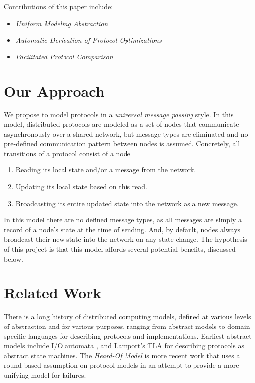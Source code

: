 \documentclass[acmsmall,screen,review]{acmart}
\begin{document}
Contributions of this paper include:
\begin{itemize}
    \item \textit{Uniform Modeling Abstraction}
    \item \textit{Automatic Derivation of Protocol Optimizations}
    \item \textit{Facilitated Protocol Comparison}
\end{itemize}

\section{Our Approach}

We propose to model protocols in a \textit{universal message passing} style. In this model, distributed protocols are modeled as a set of nodes that communicate asynchronously over a shared network, but message types are eliminated and no pre-defined communication pattern between nodes is assumed. Concretely, all transitions of a protocol consist of a node

\begin{enumerate}
    \item Reading its local state and/or a message from the network. 
    \item Updating its local state based on this read.
    \item Broadcasting its entire updated state into the network as a new message. 
\end{enumerate}
In this model there are no defined message types, as all messages are simply a record of a node’s state at the time of sending. And, by default, nodes always broadcast their new state into the network on any state change. The hypothesis of this project is that this model affords several potential benefits, discussed below.


\section{Related Work}

There is a long history of distributed computing models, defined at various levels of abstraction and for various purposes, ranging from abstract models to domain specific languages for describing protocols and implementations.
Earliest abstract models include I/O automata \cite{Lynch1989AnIT}, and Lamport's TLA \cite{lamportthetla} for describing protocols as abstract state machines. The \textit{Heard-Of Model} \cite{2006heardof} is more recent work that uses a round-based assumption on protocol models in an attempt to provide a more unifying model for failures. 
\end{document}
